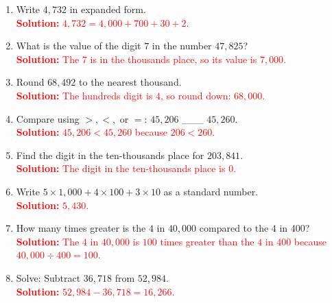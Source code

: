 \documentclass[12pt]{article}
\begin{document}
\begin{tcolorbox}[colframe=black!60, colback=white, 
coltitle=black, colbacktitle=black!15, fonttitle=\bfseries\Large, 
title=Exercises, halign title=center, left=10pt, right=10pt, top=10pt, bottom=60pt]
\begin{enumerate}[itemsep=3em]
    \item Write \( 4,732 \) in expanded form.\\
    \textcolor{red}{\textbf{Solution:} \( 4,732 = 4,000 + 700 + 30 + 2 \).}
    
    \item What is the value of the digit \( 7 \) in the number \( 47,825 \)?\\
    \textcolor{red}{\textbf{Solution:} The \(7\) is in the thousands place, so its value is \(7,000\).}
    
    \item Round \( 68,492 \) to the nearest thousand.\\
    \textcolor{red}{\textbf{Solution:} The hundreds digit is \(4\), so round down: \(68,000\).}
    
    \item Compare using \( >, <, \) or \( = \): \( 45,206 \) \_\_\_ \( 45,260 \).\\
    \textcolor{red}{\textbf{Solution:} \( 45,206 < 45,260 \) because \(206 < 260\).}
    
    \item Find the digit in the ten-thousands place for \( 203,841 \).\\
    \textcolor{red}{\textbf{Solution:} The digit in the ten-thousands place is \(0\).}
    
    \item Write \( 5 \times 1,000 + 4 \times 100 + 3 \times 10 \) as a standard number.\\
    \textcolor{red}{\textbf{Solution:} \(5,430\).}
    
    \item How many times greater is the \( 4 \) in \( 40,000 \) compared to the \( 4 \) in \( 400 \)?\\
    \textcolor{red}{\textbf{Solution:} The \(4\) in \(40,000\) is \(100\) times greater than the \(4\) in \(400\) because \(40,000 \div 400 = 100\).}
    
    \item Solve: Subtract \( 36,718 \) from \( 52,984 \).\\
    \textcolor{red}{\textbf{Solution:} \(52,984 - 36,718 = 16,266\).}
\end{enumerate}
\end{tcolorbox}
\end{document}
